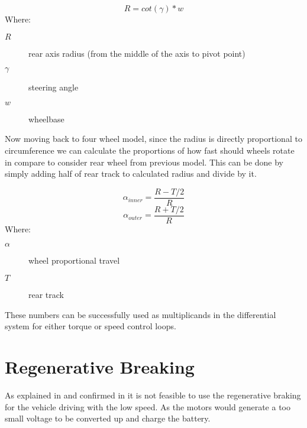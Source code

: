 \begin{equation}\label{diff_eq_w}
    R = cot( \gamma ) * w
\end{equation}
Where:
\begin{description}
    \item[$R$] rear axis radius (from the middle of the axis to pivot point)
    \item[$\gamma$] steering angle
    \item[$w$] wheelbase
\end{description}

Now moving back to four wheel model, since the radius is directly proportional to circumference we can calculate the proportions of how fast should wheels rotate in compare to consider rear wheel from previous model. This can be done by simply adding half of rear track to calculated radius and divide by it.



\begin{equation}\label{diff_eq}
    \alpha_{inner} = \frac{R - T/2}{R}
\end{equation}
\begin{equation}
    \alpha_{outer} = \frac{R + T/2}{R} 
\end{equation}
Where:
\begin{description}
    \item[$\alpha$] wheel proportional travel
    \item[$T$] rear track
\end{description}




These numbers can be successfully used as multiplicands in the differential system for either torque or speed control loops.

\section{Regenerative Breaking} \label{regenerative_theory_section}

As explained in \cite{low_speed_regenerative_breaking} and confirmed in \cite{regen_strategy} it is not feasible to use the regenerative braking for the vehicle driving with the low speed. As the motors would generate a too small voltage to be converted up and charge the battery.